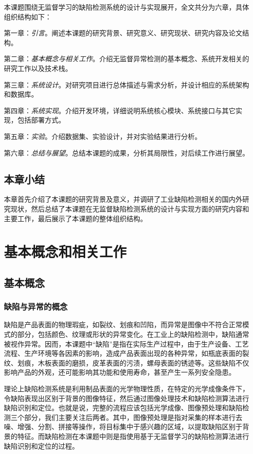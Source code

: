 \documentclass[
  ]{njuthesis}
\begin{document}
本课题围绕无监督学习的缺陷检测系统的设计与实现展开，全文共分为六章，具体组织结构如下：  

第一章：\textit{引言}。阐述本课题的研究背景、研究意义、研究现状、研究内容及论文结构。

第二章：\textit{基本概念与相关工作}。介绍无监督异常检测的基本概念、系统开发相关的研究工作以及技术栈。

第三章：\textit{系统设计}。对研究项目进行总体描述与需求分析，并设计相应的系统架构和数据库。

第四章：\textit{系统实现}。介绍开发环境，详细说明系统核心模块、系统接口与其它实现，包括部署方式。

第五章：\textit{实验}。介绍数据集、实验设计，并对实验结果进行分析。

第六章：\textit{总结与展望}。总结本课题的成果，分析其局限性，对后续工作进行展望。 

\section{本章小结}

本章首先介绍了本课题的研究背景及意义，并调研了工业缺陷检测相关的国内外研究现状，然后总结了本课题在无监督缺陷检测系统的设计与实现方面的研究内容和主要工作，最后展示了本课题的整体组织结构。

\chapter{基本概念和相关工作}

\section{基本概念}

\subsection{缺陷与异常的概念}

缺陷是产品表面的物理瑕疵，如裂纹、划痕和凹陷，而异常是图像中不符合正常模式的部分，包括颜色、纹理或形状的异常变化\cite{[9]}。在工业上的缺陷检测中，缺陷通常被视作异常。因而，本课题中“缺陷”是指在实际生产过程中，由于生产设备、工艺流程、生产环境等各因素的影响，造成产品表面出现的各种异常\cite{[10]}，如瓶底表面的裂纹、划痕，木板表面的磨损，皮革表面的污渍，螺母表面的锈迹等。这些缺陷不仅影响产品的外观，还可能影响其功能和使用寿命，甚至产生一系列安全隐患。

理论上缺陷检测系统是利用制品表面的光学物理性质，在特定的光学成像条件下，令缺陷表现出区别于背景的图像特征，然后通过图像处理技术和缺陷检测算法进行缺陷识别和定位\cite{[11]}。也就是说，完整的流程应该包括光学成像、图像预处理和缺陷检测三个部分，我们主要关注后两者。其中，图像预处理是指对采集的样本进行去噪、增强、分割、拼接等操作，将目标集中于感兴趣的区域，以提取缺陷区别于背景的特征。而缺陷检测在本课题中则是指使用基于无监督学习的缺陷检测算法进行缺陷识别和定位的过程。
\end{document}

